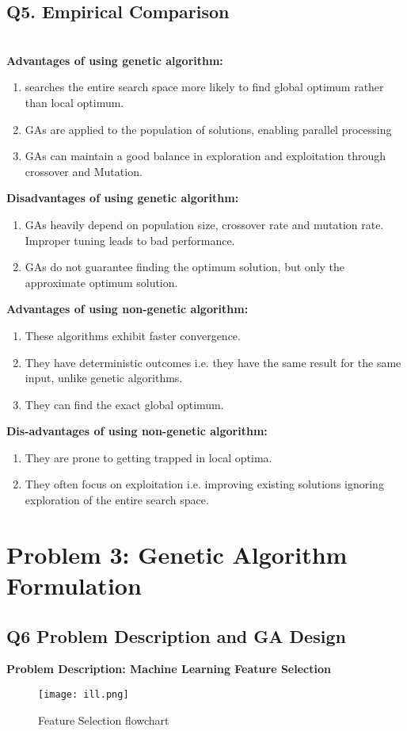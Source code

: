 \documentclass{article}
\begin{document}
{{{{\subsection*{\textbf{Q5. Empirical Comparison}}\\
\textbf{Advantages of using genetic algorithm:}
\begin{enumerate}
    \item searches the entire search space more likely to find global optimum rather than local optimum.
    \item GAs are applied to the population of solutions, enabling parallel processing
    \item GAs can maintain a good balance in exploration and exploitation through crossover and Mutation.
\end{enumerate}
\textbf{Disadvantages of using genetic algorithm:}
\begin{enumerate}
    \item GAs heavily depend on population size, crossover rate and mutation rate. Improper tuning leads to bad performance.
    \item  GAs do not guarantee finding the optimum solution, but only the approximate optimum solution.
\end{enumerate}
\textbf{Advantages of using non-genetic algorithm:}
\begin{enumerate}
    \item These algorithms exhibit faster convergence.
    \item They have deterministic outcomes i.e. they have the same result for the same input, unlike genetic algorithms.
    \item They can find the exact global optimum.
\end{enumerate}
\textbf{Dis-advantages of using non-genetic algorithm:}
\begin{enumerate}
    \item They are prone to getting trapped in local optima.
    \item They often focus on exploitation i.e. improving existing solutions ignoring exploration of the entire search space.
\end{enumerate}

\section*{Problem 3: Genetic Algorithm Formulation}
\subsection*{\textbf{Q6 Problem Description and GA Design}}
\textbf{Problem Description: Machine Learning Feature Selection}\\
\begin{figure}[h]
\centering
{
\texttt{[image: ill.png]}
}
\caption{Feature Selection flowchart}
\label{}
\end{figure}

}}}}
\end{document}
